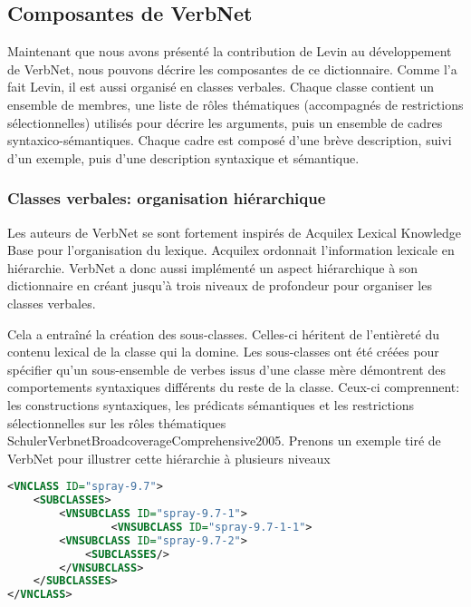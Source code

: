 \subsection {Composantes de VerbNet}  

Maintenant que nous avons présenté la contribution de Levin au développement de VerbNet, nous pouvons décrire les composantes de ce dictionnaire. Comme l'a fait Levin, il est aussi organisé en classes verbales. Chaque classe contient un ensemble de membres, une liste de rôles thématiques (accompagnés de restrictions sélectionnelles) utilisés pour décrire les arguments, puis un ensemble de cadres syntaxico-sémantiques. Chaque cadre est composé d'une brève description, suivi d'un exemple, puis d'une description syntaxique et sémantique\citep{SchulerVerbnetBroadcoverageComprehensive2005}.

\subsubsection{Classes verbales: organisation hiérarchique}

Les auteurs de VerbNet se sont fortement inspirés de Acquilex Lexical Knowledge Base \citep{CopestakeACQUILEXLKBrepresentation1992} pour l'organisation du lexique. Acquilex ordonnait l'information lexicale en hiérarchie. VerbNet a donc aussi implémenté un aspect hiérarchique à son dictionnaire en créant jusqu'à trois niveaux de profondeur pour organiser les classes verbales. 

Cela a entraîné la création des sous-classes. Celles-ci héritent de l'entièreté du contenu lexical de la classe qui la domine. Les sous-classes ont été créées pour spécifier qu'un sous-ensemble de verbes issus d'une classe mère démontrent des comportements syntaxiques différents du reste de la classe. Ceux-ci comprennent: les constructions syntaxiques, les prédicats sémantiques et les restrictions sélectionnelles sur les rôles thématiques {SchulerVerbnetBroadcoverageComprehensive2005}. Prenons un exemple tiré de VerbNet pour illustrer cette hiérarchie à plusieurs niveaux 

\begin{lstlisting}[language=XML, caption = Hiérarchie, label=hierarch]
<VNCLASS ID="spray-9.7">
    <SUBCLASSES>
        <VNSUBCLASS ID="spray-9.7-1">
                <VNSUBCLASS ID="spray-9.7-1-1">
        <VNSUBCLASS ID="spray-9.7-2">
            <SUBCLASSES/>
        </VNSUBCLASS>
    </SUBCLASSES>
</VNCLASS>
\end{lstlisting}

